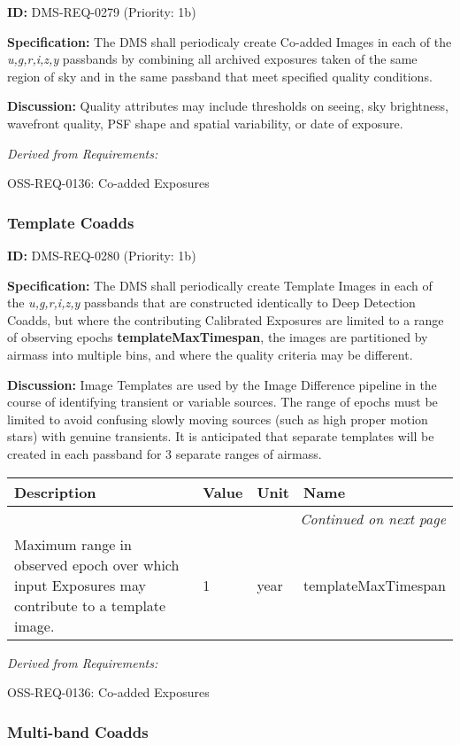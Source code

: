 \documentclass[SE,toc,lsstdraft]{lsstdoc}
\makeatletter
\newcommand{\paramname}[1]{\hspace{0pt}#1}
\newcommand{\unitname}[1]{\hspace{0pt}#1}
\newenvironment{parameters}[0]{%
\setlength\LTleft{0pt}
\setlength\LTright{\fill}
\begin{small}
\begin{longtable}[]{|p{0.49\textwidth}|l|p{0.6in}|p{1.70in}@{}|}

\hline \textbf{Description} & \textbf{Value} & \textbf{Unit} & \textbf{Name} \\ \hline
\endhead

\hline \multicolumn{4}{r}{\emph{Continued on next page}} \\
\endfoot

\hline\hline
\endlastfoot
}{%
\hline
\end{longtable}
\end{small}
}
\makeatother
\begin{document}
\label{DMS-REQ-0279}
\textbf{ID:} DMS-REQ-0279 (Priority: 1b)

\textbf{Specification:} The DMS shall periodicaly create Co-added Images in each of the \textit{u,g,r,i,z,y} passbands by combining all archived exposures taken of the same region of sky and in the same passband that meet specified quality conditions.

\textbf{Discussion: }Quality attributes may include thresholds on seeing, sky brightness, wavefront quality, PSF shape and spatial variability, or date of exposure.

\emph{Derived from Requirements:}

OSS-REQ-0136:
Co-added Exposures \newline

\subsubsection{Template Coadds}

\label{DMS-REQ-0280}
\textbf{ID:} DMS-REQ-0280 (Priority: 1b)

\textbf{Specification:} The DMS shall periodically create Template Images in each of the \textit{u,g,r,i,z,y} passbands that are constructed identically to Deep Detection Coadds, but where the contributing Calibrated Exposures are limited to a range of observing epochs \textbf{templateMaxTimespan}, the images are partitioned by airmass into multiple bins, and where the quality criteria may be different.

\textbf{Discussion: }Image Templates are used by the Image Difference pipeline in the course of identifying transient or variable sources. The range of epochs must be limited to avoid confusing slowly moving sources (such as high proper motion stars) with genuine transients. It is anticipated that separate templates will be created in each passband for 3 separate ranges of airmass.

\begin{parameters}
Maximum range in observed epoch over which input Exposures may contribute to a template image.
&
1
&
\unitname{%
year
}
&
\paramname{%
templateMaxTimespan
} \\\hline
\end{parameters}

\emph{Derived from Requirements:}

OSS-REQ-0136:
Co-added Exposures \newline

\subsubsection{Multi-band Coadds}
\end{document}
